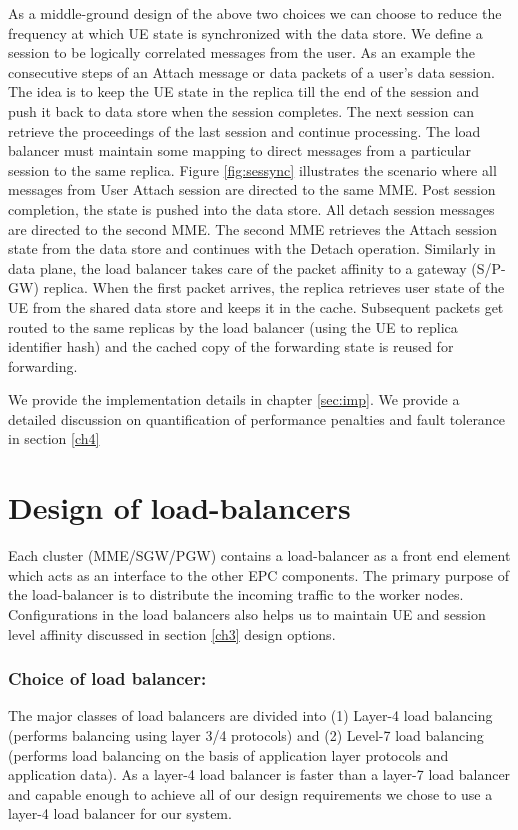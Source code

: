 \documentclass[hidelinks]{report}
\begin{document}
\par As a middle-ground design of the above two choices we can choose to reduce the frequency  at which UE state is synchronized with the data store. We define a session to be  logically correlated messages from the user. As an example the consecutive steps of an Attach message or data packets of a user's data session. The idea is to keep the UE state in the replica till the end of the session and push it back to data store when the session completes. The next session can retrieve the proceedings of the last session and continue processing. The load balancer must maintain some mapping to direct messages from a particular session to the same replica. Figure \ref{fig:sessync} illustrates the scenario where all messages from User Attach session are directed to the same MME. Post session completion, the state is pushed into the data store. All detach session messages are directed to the second MME. The second MME retrieves the Attach session state from the data store and continues with the Detach operation. Similarly in data plane, the load balancer takes care of the packet affinity to a gateway (S/P-GW) replica. When the first packet arrives, the replica retrieves user state of the UE from the shared data store and keeps it in the cache. Subsequent packets get routed to the same replicas by the load balancer (using the UE to replica identifier hash) and the cached copy of the forwarding state is reused for forwarding.

\par We provide the implementation details in chapter \ref{sec:imp}. We provide a detailed discussion on quantification of performance penalties and fault tolerance in section \ref{ch4} 

\section*{Design of load-balancers}
Each cluster (MME/SGW/PGW) contains a load-balancer as a front end element which acts as an interface to the other EPC components. The primary purpose of the load-balancer is to distribute the incoming traffic to the worker nodes. Configurations in the load balancers also helps us to maintain UE and session level affinity discussed in section \ref{ch3} design options.
\subsubsection{Choice of load balancer:}
The major classes of load balancers are divided into (1) Layer-4 load balancing (performs balancing using layer 3/4 protocols) and (2) Level-7 load balancing (performs load balancing on the basis of application layer protocols and application data). As a layer-4 load balancer is faster than a layer-7 load balancer and capable enough to achieve all of our design requirements we chose to use a layer-4 load balancer for our system.
\end{document}
